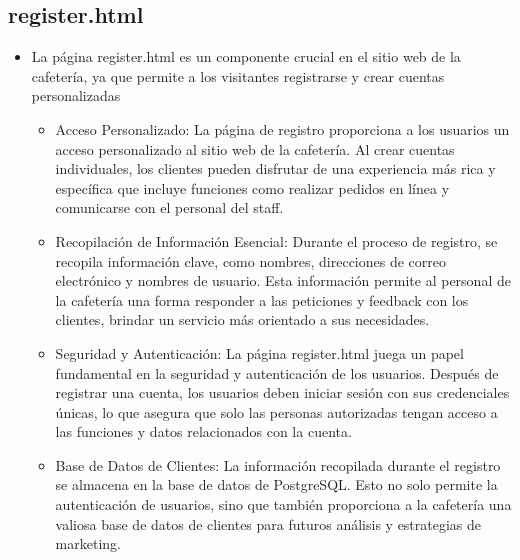 \documentclass{article}
\begin{document}
        
 	\subsection{register.html}
        \begin{itemize}
  	\item  La página register.html es un componente crucial en el sitio web de la cafetería, ya que permite a los visitantes registrarse y crear cuentas personalizadas
            \begin{itemize}
      	\item  Acceso Personalizado: La página de registro proporciona a los usuarios un acceso personalizado al sitio web de la cafetería. Al crear cuentas individuales, los clientes pueden disfrutar de una experiencia más rica y específica que incluye funciones como realizar pedidos en línea y comunicarse con el personal del staff.
       	\item  Recopilación de Información Esencial: Durante el proceso de registro, se recopila información clave, como nombres, direcciones de correo electrónico y nombres de usuario. Esta información permite al personal de la cafetería una forma responder a las peticiones y feedback con los clientes, brindar un servicio más orientado a sus necesidades.
       	\item  Seguridad y Autenticación: La página register.html juega un papel fundamental en la seguridad y autenticación de los usuarios. Después de registrar una cuenta, los usuarios deben iniciar sesión con sus credenciales únicas, lo que asegura que solo las personas autorizadas tengan acceso a las funciones y datos relacionados con la cuenta.
       	\item  Base de Datos de Clientes: La información recopilada durante el registro se almacena en la base de datos de PostgreSQL. Esto no solo permite la autenticación de usuarios, sino que también proporciona a la cafetería una valiosa base de datos de clientes para futuros análisis y estrategias de marketing.
                
       
            \end{itemize}
        \end{itemize}
\end{document}
